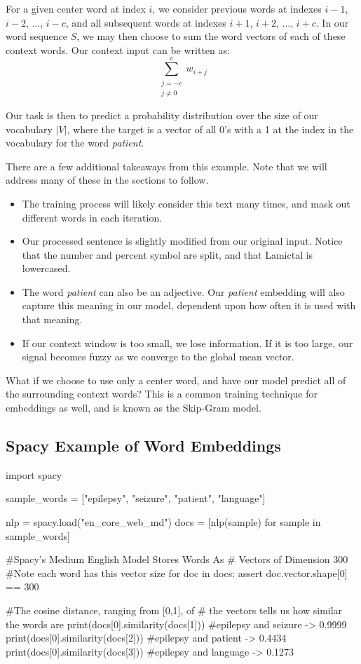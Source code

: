 For a given center word at index $i$, we consider previous words at indexes $i-1$, $i-2$, ..., $i-c$, and all subsequent words at indexes $i+1$, $i+2$, ..., $i+c$.
In our word sequence $S$, we may then choose to sum the word vectors of each of these context words.
Our context input can be written as:
\begin{equation}
  \sum_{ \substack {j=-c \\ j \neq 0}}^c w_{i+j}
\end{equation}

Our task is then to predict a probability distribution over the size of our vocabulary $|V|$, where the target is a vector of all 0's with a 1 at the index in the vocabulary for the word \textit{patient}.

There are a few additional takeaways from this example.
Note that we will address many of these in the sections to follow.
\begin{itemize}
  \item The training process will likely consider this text many times, and mask out different words in each iteration.
  \item Our processed sentence is slightly modified from our original input.
  Notice that the number and percent symbol are split, and that Lamictal is lowercased.
  \item The word \textit{patient} can also be an adjective.
  Our \textit{patient} embedding will also capture this meaning in our model, dependent upon how often it is used with that meaning.
  \item If our context window is too small, we lose information.
  If it is too large, our signal becomes fuzzy as we converge to the global mean vector.
\end{itemize}

What if we choose to use only a center word, and have our model predict all of the surrounding context words?
This is a common training technique for embeddings as well, and is known as the Skip-Gram model.

\subsection{Spacy Example of Word Embeddings}

\begin{python}
  import spacy

  sample_words = ["epilepsy", "seizure",
                  "patient", "language"]

  nlp = spacy.load("en_core_web_md")
  docs = [nlp(sample) for sample in sample_words]

  #Spacy's Medium English Model Stores Words As
  # Vectors of Dimension 300
  #Note each word has this vector size
  for doc in docs:
      assert doc.vector.shape[0] == 300

  #The cosine distance, ranging from [0,1], of
  # the vectors tells us how similar the words are
  print(docs[0].similarity(docs[1]))
  #epilepsy and seizure -> 0.9999
  print(docs[0].similarity(docs[2]))
  #epilepsy and patient -> 0.4434
  print(docs[0].similarity(docs[3]))
  #epilepsy and language -> 0.1273
\end{python}

